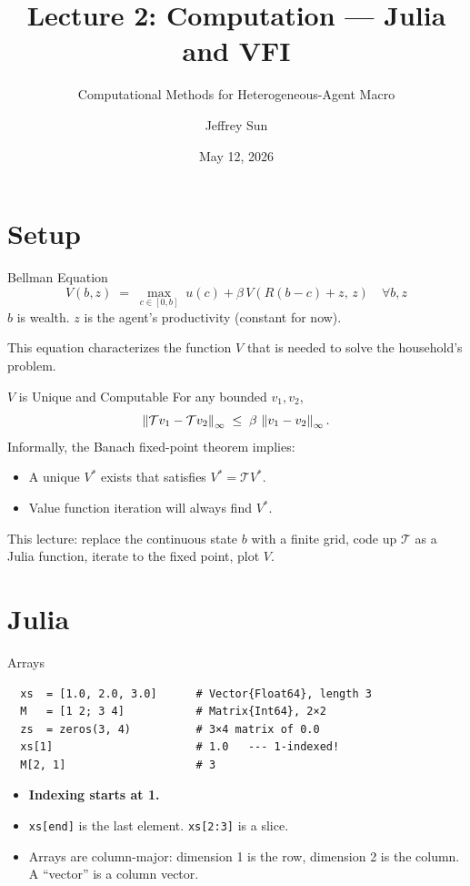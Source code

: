 \documentclass[10pt,aspectratio=169]{beamer}
\title{Lecture 2: Computation --- Julia and VFI}
\subtitle{Computational Methods for Heterogeneous-Agent Macro}
\author{Jeffrey Sun}
\institute{University of Toronto}
\date{May 12, 2026}
\begin{document}
\maketitle

\section{Setup}

\begin{frame}{Bellman Equation}
  \[
    \boxed{\;
      V(b, z) \;=\; \max_{c \in [0, b]} \; u(c)
        + \beta \, V(R(b-c) + z,\, z)\quad\forall b,z
    \;}
  \]
  $b$ is wealth. $z$ is the agent's productivity (constant for now).
  
  This equation characterizes the function $V$ that is needed to solve the household's problem.
\end{frame}

\begin{frame}{$V$ is Unique and Computable}
  For any bounded $v_1, v_2$,
  \[
    \left\| \mathcal{T} v_1 - \mathcal{T} v_2 \right\|_\infty
      \;\le\; \beta \, \left\| v_1 - v_2 \right\|_\infty.
  \]
  Informally, the Banach fixed-point theorem implies:
  \begin{itemize}
    \item A unique $V^*$ exists that satisfies $V^* = \mathcal{T} V^*$.
    \item Value function iteration will always find $V^*$.
  \end{itemize}
  This lecture: replace the continuous state $b$ with a finite grid, code up $\mathcal{T}$ as a Julia function, iterate to the fixed point, plot $V$.
\end{frame}

\section{Julia}

\begin{frame}[fragile]{Arrays}
  \begin{lstlisting}
  xs  = [1.0, 2.0, 3.0]      # Vector{Float64}, length 3
  M   = [1 2; 3 4]           # Matrix{Int64}, 2×2
  zs  = zeros(3, 4)          # 3×4 matrix of 0.0
  xs[1]                      # 1.0   --- 1-indexed!
  M[2, 1]                    # 3
  \end{lstlisting}
  \begin{itemize}
    \item \textbf{Indexing starts at 1.}
    \item \texttt{xs[end]} is the last element. \texttt{xs[2:3]} is a slice.
    \item Arrays are column-major: dimension 1 is the row, dimension 2 is the column. A ``vector'' is a column vector.
  \end{itemize}
\end{frame}
\end{document}
